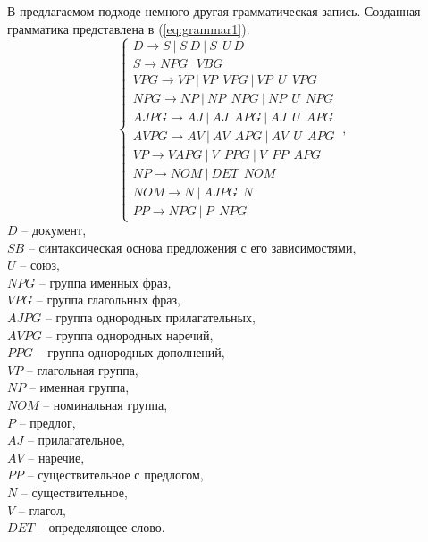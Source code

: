 \documentclass[../main]{subfiles}
\begin{document}
В предлагаемом подходе немного другая грамматическая запись. Созданная грамматика представлена в (\ref{eq:grammar1}). 
\begin{equation}
    \label{eq:grammar1}
    \left\{ 
        \begin{array}{l}
            D \rightarrow S\ |\ S\ D\ |\ S\ \ U\ D\ \\
            S \rightarrow NPG\ \ \ VBG \\
            VPG \rightarrow VP\ |\ VP\ \ VPG\ |\ VP\ \ U\ \ VPG \\
            NPG \rightarrow NP\ |\ NP\ \ NPG\ |\ NP\ \ U\ \ NPG \\
            AJPG \rightarrow AJ\ |\ AJ\ \ APG\ |\ AJ\ \ U\ \ APG \\
            AVPG \rightarrow AV\ |\ AV\ \ APG\ |\ AV\ \ U\ \ APG \\
            VP \rightarrow V APG\ |\ V\ \ PPG\ |\ V\ \ PP\ \ APG \\
            NP \rightarrow NOM\ |\ DET\ \ NOM \\
            NOM \rightarrow N\ |\ AJPG\ \ N \\
            PP \rightarrow NPG\ |\ P\ \ NPG
        \end{array}
    \right.\ ,
\end{equation}
$D$ -- документ,\\
\makebox[1.25cm]{}$SB$ -- синтаксическая основа предложения с его зависимостями,\\
\makebox[1.25cm]{}$U$ -- союз,\\
\makebox[1.25cm]{}$NPG$ -- группа именных фраз,\\
\makebox[1.25cm]{}$VPG$ -- группа глагольных фраз,\\
\makebox[1.25cm]{}$AJPG$ -- группа однородных прилагательных,\\
\makebox[1.25cm]{}$AVPG$ -- группа однородных наречий,\\
\makebox[1.25cm]{}$PPG$ -- группа однородных дополнений,\\
\makebox[1.25cm]{}$VP$ -- глагольная группа,\\
\makebox[1.25cm]{}$NP$ -- именная группа,\\
\makebox[1.25cm]{}$NOM$ -- номинальная группа,\\
\makebox[1.25cm]{}$P$ -- предлог,\\
\makebox[1.25cm]{}$AJ$ -- прилагательное,\\
\makebox[1.25cm]{}$AV$ -- наречие,\\
\makebox[1.25cm]{}$PP$ -- существительное с предлогом,\\
\makebox[1.25cm]{}$N$ -- существительное,\\
\makebox[1.25cm]{}$V$ -- глагол,\\
\makebox[1.25cm]{}$DET$ -- определяющее слово.
\end{document}
